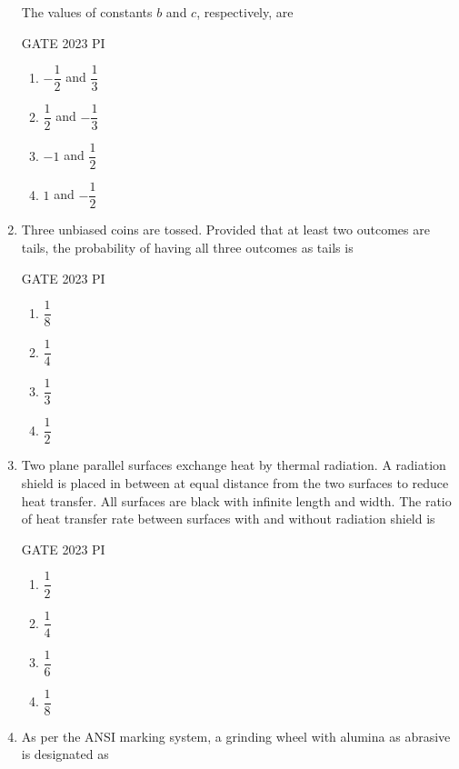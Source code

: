 \documentclass[journal,12pt,onecolumn]{IEEEtran}
\theoremstyle{remark}
\begin{document}
\begin{enumerate}
The values of constants \(b\) and \(c\), respectively, are

\hfill{GATE 2023 PI}

\begin{multicols}{2}
\begin{enumerate}
    \item $-\dfrac{1}{2}$ and $\dfrac{1}{3}$
    \item $\dfrac{1}{2}$ and $-\dfrac{1}{3}$
    \item $-1$ and $\dfrac{1}{2}$
    \item $1$ and $-\dfrac{1}{2}$
\end{enumerate}
\end{multicols}
\item Three unbiased coins are tossed. Provided that at least two outcomes are tails, the probability of having all three outcomes as tails is

\hfill{GATE 2023 PI}

\begin{multicols}{2}
\begin{enumerate}
    \item $\dfrac{1}{8}$
    \item $\dfrac{1}{4}$
    \item $\dfrac{1}{3}$
    \item $\dfrac{1}{2}$
\end{enumerate}
\end{multicols}

\item Two plane parallel surfaces exchange heat by thermal radiation. A radiation shield is placed in between at equal distance from the two surfaces to reduce heat transfer. All surfaces are black with infinite length and width. The ratio of heat transfer rate between surfaces with and without radiation shield is

\hfill{GATE 2023 PI}

\begin{multicols}{2}
\begin{enumerate}
    \item $\dfrac{1}{2}$
    \item $\dfrac{1}{4}$
    \item $\dfrac{1}{6}$
    \item $\dfrac{1}{8}$
\end{enumerate}
\end{multicols}
\item As per the ANSI marking system, a grinding wheel with alumina as abrasive is designated as


\end{enumerate}
\end{document}
